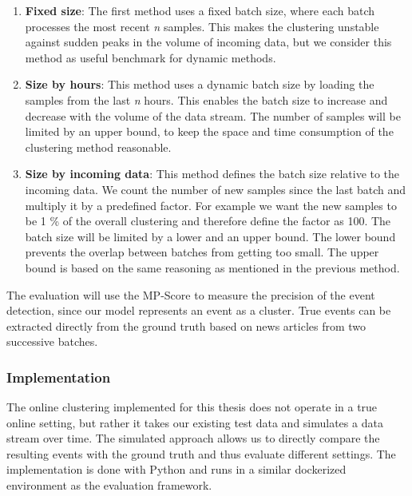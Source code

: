 \begin{enumerate}
    \item \textbf{Fixed size}: The first method uses a fixed batch size, where each batch processes the most recent \textit{n} samples. This makes the clustering unstable against sudden peaks in the volume of incoming data, but we consider this method as useful benchmark for dynamic methods.
    \item \textbf{Size by hours}: This method uses a dynamic batch size by loading the samples from the last \textit{n} hours. This enables the batch size to increase and decrease with the volume of the data stream. The number of samples will be limited by an upper bound, to keep the space and time consumption of the clustering method reasonable. 
    \item \textbf{Size by incoming data}: This method defines the batch size relative to the incoming data. We count the number of new samples since the last batch and multiply it by a predefined factor. For example we want the new samples to be 1 \% of the overall clustering and therefore define the factor as 100. The batch size will be limited by a lower and an upper bound. The lower bound prevents the overlap between batches from getting too small. The upper bound is based on the same reasoning as mentioned in the previous method.
\end{enumerate}

The evaluation will use the MP-Score to measure the precision of the event detection, since our model represents an event as a cluster. True events can be extracted directly from the ground truth based on news articles from two successive batches.

\subsubsection{Implementation}
\label{sec:online_clustering_implementation}

The online clustering implemented for this thesis does not operate in a true online setting, but rather it takes our existing test data and simulates a data stream over time. The simulated approach allows us to directly compare the resulting events with the ground truth and thus evaluate different settings. The implementation is done with Python and runs in a similar dockerized environment as the evaluation framework.

